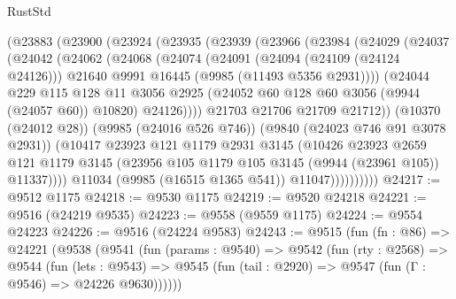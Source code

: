 \begin{lexlean}{RustStd}
\begin{coremodule}
            (@23883
              (@23900
                (@23924
                  (@23935
                    (@23939
                      (@23966
                        (@23984
                          (@24029
                            (@24037
                              (@24042
                                (@24062
                                  (@24068
                                    (@24074
                                      (@24091
                                        (@24094 (@24109 (@24124 @24126)))
                                        @21640
                                        @9991
                                        @16445
                                        (@9985 (@11493 @5356 @2931))))
                                    (@24044
                                      @229
                                      @115
                                      @128
                                      @11
                                      @3056
                                      @2925
                                      (@24052 @60 @128 @60 @3056 (@9944 (@24057 @60)) @10820)
                                      @24126))))
                              @21703
                              @21706
                              @21709
                              @21712))
                          (@10370 (@24012 @28))
                          (@9985 (@24016 @526 @746))
                          (@9840 (@24023 @746 @91 @3078 @2931))
                          (@10417
                            @23923
                            @121
                            @1179
                            @2931
                            @3145
                            (@10426
                              @23923
                              @2659
                              @121
                              @1179
                              @3145
                              (@23956 @105 @1179 @105 @3145 (@9944 (@23961 @105)) @11337))))
                        @11034
                        (@9985 (@16515 @1365 @541))
                        @11047))))))))))
@24217 := @9512 @1175
@24218 := @9530 @1175
@24219 := @9520 @24218
@24221 := @9516 (@24219 @9535)
@24223 := @9558 (@9559 @1175)
@24224 := @9554 @24223
@24226 := @9516 (@24224 @9583)
@24243 := @9515
    (fun (fn : @86) =>
    @24221
      (@9538
        (@9541
          (fun (params : @9540) =>
          @9542
            (fun (rty : @2568) =>
            @9544
              (fun (lets : @9543) =>
              @9545 (fun (tail : @2920) => @9547 (fun (Γ : @9546) => @24226 @9630))))))

\end{coremodule}
\end{lexlean}
